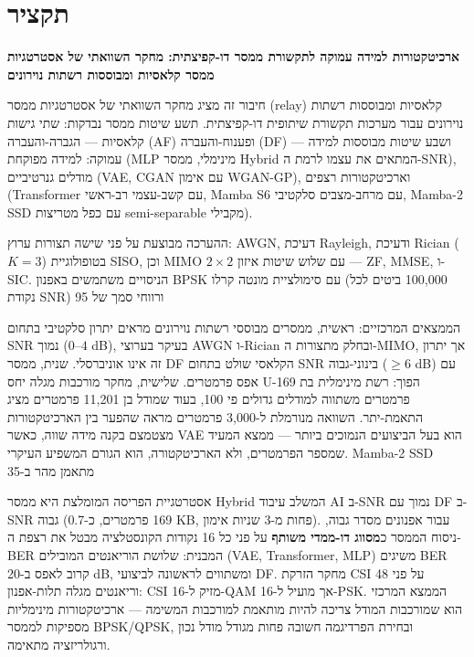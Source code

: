 \clearpage
\chapter*{\texthebrew{תקציר}}

\begin{otherlanguage}{hebrew}
\begin{flushright}
\label{sec:abstract-hebrew}

\textbf{ארכיטקטורות למידה עמוקה לתקשורת ממסר דו-קפיצתית: מחקר השוואתי של אסטרטגיות ממסר קלאסיות ומבוססות רשתות נוירונים}

חיבור זה מציג מחקר השוואתי של אסטרטגיות ממסר (relay) קלאסיות ומבוססות רשתות נוירונים עבור מערכות תקשורת שיתופית דו-קפיצתית. תשע שיטות ממסר נבדקות: שתי גישות קלאסיות — הגברה-והעברה (AF) ופענוח-והעברה (DF) — ושבע שיטות מבוססות למידה עמוקה: למידה מפוקחת (MLP מינימלי, ממסר Hybrid המתאים את עצמו לרמת ה-SNR), מודלים גנרטיביים (VAE, CGAN עם אימון WGAN-GP), וארכיטקטורות רצפים (Transformer עם קשב-עצמי רב-ראשי, Mamba S6 עם מרחב-מצבים סלקטיבי, Mamba-2 SSD עם כפל מטריצות semi-separable מקבילי).

ההערכה מבוצעת על פני שישה תצורות ערוץ: AWGN, דעיכת Rayleigh, ודעיכת Rician ($K=3$) בטופולוגיית SISO, וכן MIMO $2\times2$ עם שלוש שיטות איזון — ZF, MMSE, ו-SIC. הניסויים משתמשים באפנון BPSK עם סימולציית מונטה קרלו (100,000 ביטים לכל נקודת SNR) ורווחי סמך של 95%

הממצאים המרכזיים: ראשית, ממסרים מבוססי רשתות נוירונים מראים יתרון סלקטיבי בתחום SNR נמוך ($0$–$4$ dB), בעיקר בערוצי AWGN ו-Rician ובחלק מתצורות ה-MIMO, אך יתרון זה אינו אוניברסלי. שנית, ממסר DF הקלאסי שולט בתחום SNR בינוני-גבוה ($\ge6$ dB) עם אפס פרמטרים. שלישית, מחקר מורכבות מגלה יחס U-הפוך: רשת מינימלית בת 169 פרמטרים משתווה למודלים גדולים פי 100, בעוד שמודל בן 11,201 פרמטרים מציג התאמת-יתר. השוואה מנורמלת ל-3,000 פרמטרים מראה שהפער בין הארכיטקטורות מצטמצם בקנה מידה שווה, כאשר VAE הוא בעל הביצועים הנמוכים ביותר — ממצא המעיד שמספר הפרמטרים, ולא הארכיטקטורה, הוא הגורם המשפיע העיקרי. Mamba-2 SSD מתאמן מהר ב-35%

אסטרטגיית הפריסה המומלצת היא ממסר Hybrid המשלב עיבוד AI ב-SNR נמוך עם DF ב-SNR גבוה (169 פרמטרים, כ-0.7 KB, פחות מ-3 שניות אימון). עבור אפנונים מסדר גבוה, ניסוח הממסר כ\textbf{מסווג דו-ממדי משותף} על פני כל 16 נקודות הקונסטלציה מבטל את רצפת ה-BER המבנית: שלושת הוריאנטים המובילים (VAE, Transformer, MLP) משיגים BER קרוב לאפס ב-20 dB, ומשתווים לראשונה לביצועי DF. מחקר הזרקת CSI על פני 48 וריאנטים מגלה תלות-אפנון: CSI מזיק ל-16-QAM אך מועיל ל-16-PSK. הממצא המרכזי הוא שמורכבות המודל צריכה להיות מותאמת למורכבות המשימה — ארכיטקטורות מינימליות מספיקות לממסר BPSK/QPSK, ובחירת הפרדיגמה חשובה פחות מגודל מודל נכון ורגולריזציה מתאימה.

\end{flushright}
\end{otherlanguage}

